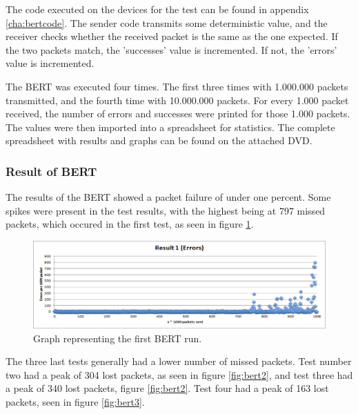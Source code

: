The code executed on the devices for the test can be found in appendix \ref{cha:bertcode}. The sender code transmits some deterministic value, and the receiver checks whether the received packet is the same as the one expected. If the two packets match, the 'successes' value is incremented. If not, the 'errors' value is incremented.

The BERT was executed four times. The first three times with 1.000.000 packets transmitted, and the fourth time with 10.000.000 packets. For every 1.000 packet received, the number of errors and successes were printed for those 1.000 packets. 
The values were then imported into a spreadsheet for statistics.
The complete spreadsheet with results and graphs can be found on the attached DVD. 

\subsubsection*{Result of BERT}
The results of the BERT showed a packet failure of under one percent. Some spikes were present in the test results, with the highest being at 797 missed packets, which occured in the first test, as seen in figure \ref{fig:bert1}.

\begin{figure}[h!]
\hspace*{-2cm}
\includegraphics[width=1.3\textwidth]{chapters/test/figures/res1.png}
\caption{Graph representing the first BERT run.}
\label{fig:bert1}
\end{figure}

The three last tests generally had a lower number of missed packets. Test number two had a peak of 304 lost packets, as seen in figure \ref{fig:bert2}, and test three had a peak of 340 lost packets, figure \ref{fig:bert2}. Test four had a peak of 163 lost packets, seen in figure \ref{fig:bert3}.

